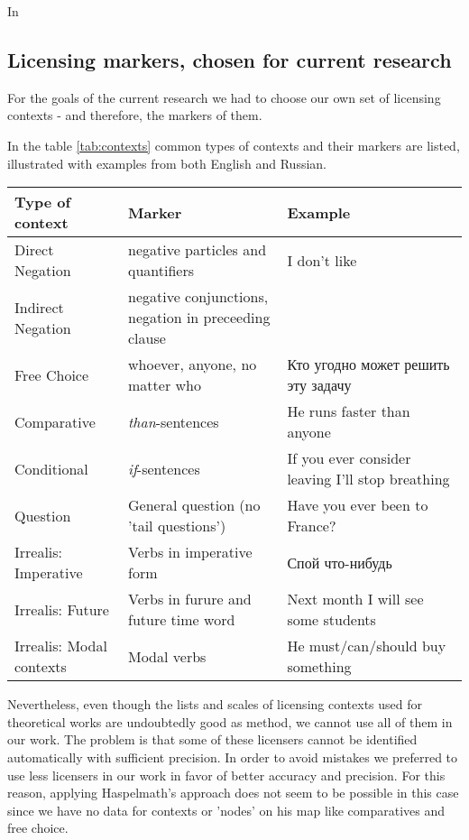 \documentclass[a4paper,12pt]{article}
\begin{document}
	In \parencite{haspelmathpron} 
	
	\subsection{Licensing markers, chosen for current research}
	For the goals of the current research we had to choose our own set of licensing contexts - and therefore, the markers of them.
	
	In the table \ref{tab:contexts} common types of contexts and their markers are listed, illustrated with examples from both English and Russian.
	
	\begin{longtable}{|p{0.25\linewidth}|p{0.35\linewidth}|p{0.4\linewidth}|}
		\hline
		\textbf{Type of context} & \textbf{Marker} & \textbf{Example} \\ \hline
		Direct Negation & negative particles and quantifiers & I don't like \\ \hline
		Indirect Negation & negative conjunctions, negation in preceeding clause & \\ \hline
		Free Choice & whoever, anyone, no matter who & Кто угодно может решить эту задачу \\ \hline
		Comparative & \textit{than}-sentences & He runs faster than anyone \\ \hline
		Conditional & \textit{if}-sentences & If you ever consider leaving I'll stop breathing \\ \hline
		Question & General question (no 'tail questions') & Have you ever been to France? \\ \hline
		Irrealis: Imperative & Verbs in imperative form & Спой что-нибудь \\ \hline
		Irrealis: Future & Verbs in furure and future time word & Next month I will see some students \\ \hline
		Irrealis: Modal contexts & Modal verbs & He must/can/should buy something \\ \hline
	\end{longtable}\label{tab:contexts}
	
	Nevertheless, even though the lists and scales of licensing contexts used for theoretical works are undoubtedly good as method, we cannot use all of them in our work. The problem is that some of these licensers cannot be identified automatically with sufficient precision. In order to avoid mistakes we preferred to use less licensers in our work in favor of better accuracy and precision. For this reason, applying Haspelmath's approach does not seem to be possible in this case since we have no data for contexts or 'nodes' on his map like comparatives and free choice.
	
\end{document}
